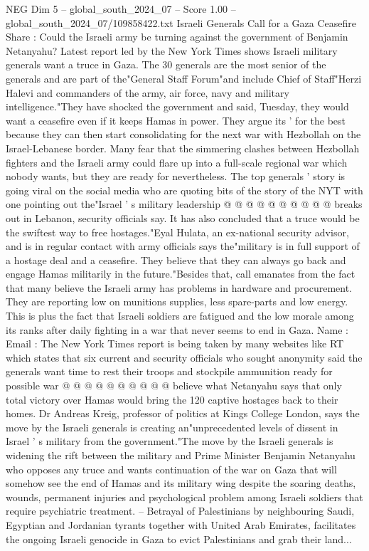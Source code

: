 \begin{textsample}{NEG Dim 5 – global\_south\_2024\_07 – Score 1.00 – global\_south\_2024\_07/109858422.txt}  \label{ex:f5_neg_280}
Israeli Generals Call for a Gaza Ceasefire Share : Could the Israeli army be turning against the government of Benjamin Netanyahu?
Latest report led by the New York Times shows Israeli military generals want a truce in Gaza.
The 30 generals are the most senior of the generals and are part of the"General Staff Forum"and include Chief of Staff"Herzi Halevi and commanders of the army, air force, navy and military intelligence."They have shocked the government and said, Tuesday, they would want a ceasefire even if it keeps Hamas in power.
They argue its ' for the best because they can then start consolidating for the next war with Hezbollah on the Israel-Lebanese border.
Many fear that the simmering clashes between Hezbollah fighters and the Israeli army could flare up into a full-scale regional war which nobody wants, but they are ready for nevertheless.
The top generals ' story is going viral on the social media who are quoting bits of the story of the NYT with one pointing out the"Israel ' s military leadership @ @ @ @ @ @ @ @ @ @ breaks out in Lebanon, security officials say.
It has also concluded that a truce would be the swiftest way to free hostages."Eyal Hulata, an ex-national security advisor, and is in regular contact with army officials says the"military is in full support of a hostage deal and a ceasefire.
They believe that they can always go back and engage Hamas militarily in the future."Besides that, call emanates from the fact that many believe the Israeli army has problems in hardware and procurement.
They are reporting low on munitions supplies, less spare-parts and low energy.
This is plus the fact that Israeli soldiers are fatigued and the low morale among its ranks after daily fighting in a war that never seems to end in Gaza.
Name : Email : The New York Times report is being taken by many websites like RT which states that six current and security officials who sought anonymity said the generals want time to rest their troops and stockpile ammunition ready for possible war @ @ @ @ @ @ @ @ @ @ believe what Netanyahu says that only total victory over Hamas would bring the 120 captive hostages back to their homes.
Dr Andreas Kreig, professor of politics at Kings College London, says the move by the Israeli generals is creating an"unprecedented levels of dissent in Israel ' s military from the government."The move by the Israeli generals is widening the rift between the military and Prime Minister Benjamin Netanyahu who opposes any truce and wants continuation of the war on Gaza that will somehow see the end of Hamas and its military wing despite the soaring deaths, wounds, permanent injuries and psychological problem among Israeli soldiers that require psychiatric treatment. -- Betrayal of Palestinians by neighbouring Saudi, Egyptian and Jordanian tyrants together with United Arab Emirates, facilitates the ongoing Israeli genocide in Gaza to evict Palestinians and grab their land...

\end{textsample}
